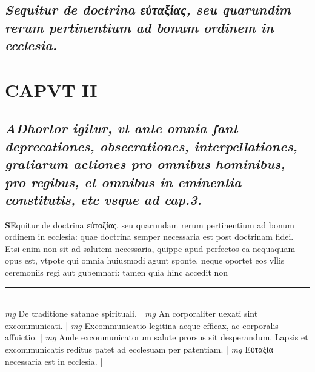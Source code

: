 \documentclass{article}
\begin{document}
\begin{pages}
{}
\subsection*{\textit{Sequitur de doctrina εὐταξίας, seu quarundim rerum pertinentium ad bonum ordinem in ecclesia. }}
\section{CAPVT II}
{}
\subsection*{\textit{\huge\textbf{A}\normalsize Dhortor igitur, vt ante omnia fant deprecationes, obsecrationes, interpellationes, gratiarum actiones pro omnibus hominibus, pro regibus, et omnibus in eminentia constitutis, etc vsque  ad cap.3. }}\pstart \huge\textbf{S}\normalsize Equitur de doctrina εὐταξίας, seu quarundam rerum pertinentium ad bonum ordinem in ecclesia: quae doctrina semper necessaria est post doctrinam fidei. Etsi enim non sit ad salutem necessaria, quippe apud perfectos ea nequaquam opus est, vtpote qui omnia huiusmodi agunt sponte, neque oportet eos vllis ceremoniis regi aut gubemnari: tamen quia hinc accedit non\pend
\vspace{0.5cm}\noindent
\vspace{0.2cm}\rule{1cm}{0.2pt}\\ 
\hspace{0.2cm}\textit{mg}
\footnotesize De traditione satanae spirituali. 
\normalsize| 
\hspace{0.2cm}\textit{mg}
\footnotesize An corporaliter uexati sint excommunicati. 
\normalsize| 
\hspace{0.2cm}\textit{mg}
\footnotesize Excommunicatio legitina aeque  efficax, ac corporalis affuictio. 
\normalsize| 
\hspace{0.2cm}\textit{mg}
\footnotesize Ande exconmunicatorum salute prorsus sit desperandum. Lapsis et excommunicatis reditus patet ad ecclesuam per patentiam. 
\normalsize| 
\hspace{0.2cm}\textit{mg}
\footnotesize Εὐταξία necessaria est in ecclesia. 
\normalsize| 

\end{pages}
\end{document}
